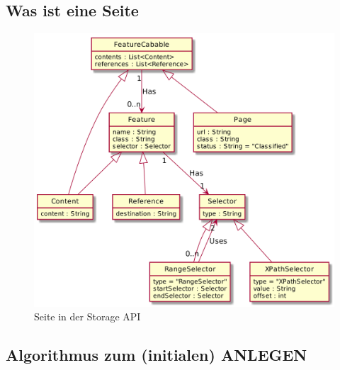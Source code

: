         \subsection{Was ist eine Seite}
            \begin{figure}
                \centering
                \includegraphics[width=\textwidth]{../resources/storage-api-data-model/page.png}
                \caption{Seite in der Storage API}
                \label{image:storageApiPageModel}
            \end{figure}
        
        \subsection{Algorithmus zum (initialen) ANLEGEN}
            

